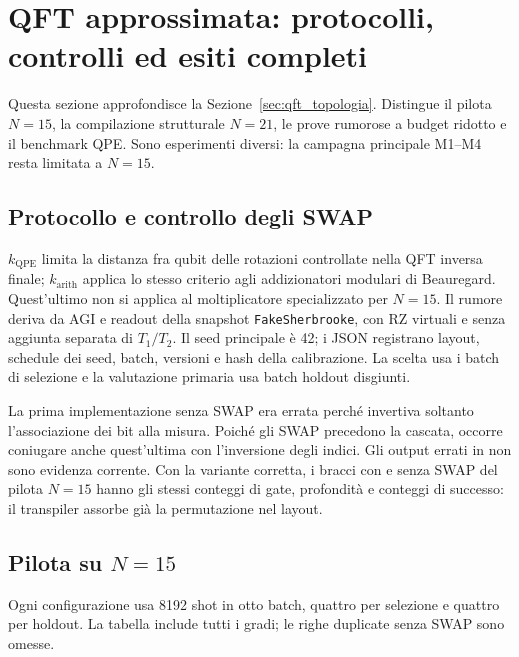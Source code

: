 \section{QFT approssimata: protocolli, controlli ed esiti completi}
\label{sec:app_aqft}

Questa sezione approfondisce la Sezione~\ref{sec:qft_topologia}.
Distingue il pilota $N=15$, la compilazione strutturale $N=21$, le prove
rumorose a budget ridotto e il benchmark QPE. Sono esperimenti diversi:
la campagna principale M1--M4 resta limitata a $N=15$.

\subsection{Protocollo e controllo degli SWAP}

$k_{\mathrm{QPE}}$ limita la distanza fra qubit delle rotazioni
controllate nella QFT inversa finale; $k_{\mathrm{arith}}$ applica lo
stesso criterio agli addizionatori modulari di Beauregard.
Quest'ultimo non si applica al moltiplicatore specializzato per $N=15$.
Il rumore deriva da AGI e readout della snapshot \texttt{FakeSherbrooke},
con RZ virtuali e senza aggiunta separata di $T_1/T_2$. Il seed principale
è 42; i JSON registrano layout, schedule dei seed, batch, versioni e hash
della calibrazione. La scelta usa i batch di selezione e la valutazione
primaria usa batch holdout disgiunti.

La prima implementazione senza SWAP era errata perché invertiva soltanto
l'associazione dei bit alla misura. Poiché gli SWAP precedono la cascata,
occorre coniugare anche quest'ultima con l'inversione degli indici.
Gli output errati in  non sono
evidenza corrente. Con la variante corretta, i bracci con e senza SWAP
del pilota $N=15$ hanno gli stessi conteggi di gate, profondità e
conteggi di successo: il transpiler assorbe già la permutazione nel layout.

\subsection{Pilota su \texorpdfstring{$N=15$}{N=15}}

Ogni configurazione usa 8192 shot in otto batch, quattro per selezione
e quattro per holdout. La tabella include tutti i gradi; le righe
duplicate senza SWAP sono omesse.

